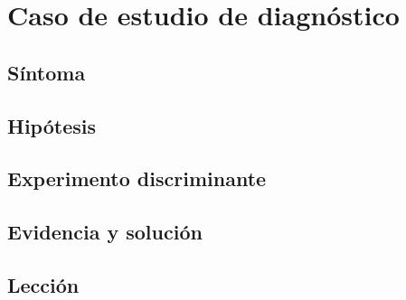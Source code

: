 \section{Caso de estudio de diagnóstico}
\label{sec:diagnostico}


\subsection*{Síntoma}

\subsection*{Hipótesis}

\subsection*{Experimento discriminante}

\subsection*{Evidencia y solución}

\subsection*{Lección}
